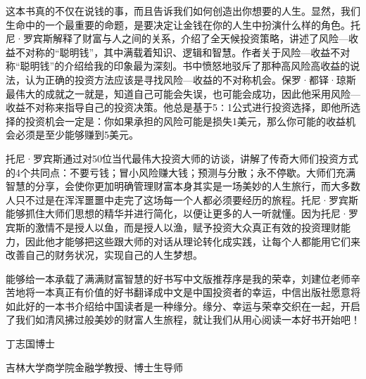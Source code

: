 这本书真的不仅在说钱的事，而且告诉我们如何创造出你想要的人生。显然，我们生命中的一个最重要的命题，是要决定让金钱在你的人生中扮演什么样的角色。托尼·罗宾斯解释了财富与人之间的关系，介绍了全天候投资策略，讲述了风险—收益不对称的“聪明钱”，其中满载着知识、逻辑和智慧。作者关于风险—收益不对称“聪明钱”的介绍给我的印象最为深刻。书中愤怒地驳斥了那种高风险高收益的说法，认为正确的投资方法应该是寻找风险—收益的不对称机会。保罗·都铎·琼斯最伟大的成就之一就是，知道自己可能会失误，也可能会成功，因此他采用风险—收益不对称来指导自己的投资决策。他总是基于5∶1公式进行投资选择，即他所选择的投资机会一定是：你如果承担的风险可能是损失1美元，那么你可能的收益机会必须是至少能够赚到5美元。

托尼·罗宾斯通过对50位当代最伟大投资大师的访谈，讲解了传奇大师们投资方式的4个共同点：不要亏钱；冒小风险赚大钱；预测与分散；永不停歇。大师们充满智慧的分享，会使你更加明确管理财富本身其实是一场美妙的人生旅行，而大多数人只不过是在浑浑噩噩中走完了这场每一个人都必须要经历的旅程。托尼·罗宾斯能够抓住大师们思想的精华并进行简化，以便让更多的人一听就懂。因为托尼·罗宾斯的激情不是授人以鱼，而是授人以渔，赋予投资大众真正有效的投资理财能力，因此他才能够把这些跟大师的对话从理论转化成实践，让每个人都能用它们来改善自己的财务状况，实现自己的人生梦想。

能够给一本承载了满满财富智慧的好书写中文版推荐序是我的荣幸，刘建位老师辛苦地将一本真正有价值的好书翻译成中文是中国投资者的幸运，中信出版社愿意将如此好的一本书介绍给中国读者是一种缘分。缘分、幸运与荣幸交织在一起，开启了我们如清风拂过般美妙的财富人生旅程，就让我们从用心阅读一本好书开始吧！

{\kaishu \hfill 丁志国博士

\hfill 吉林大学商学院金融学教授、博士生导师}
